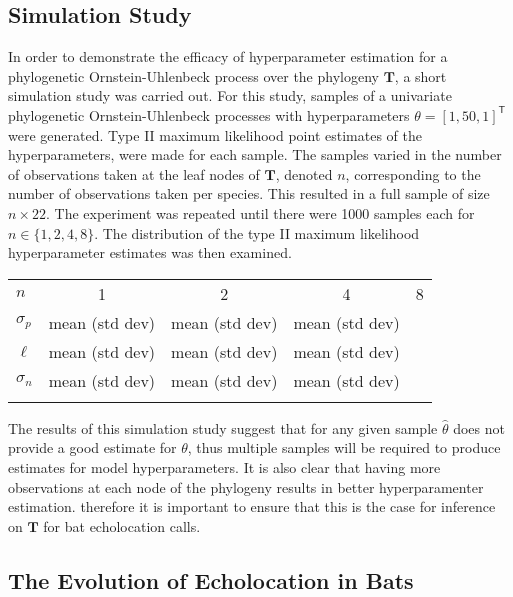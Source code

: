 \documentclass[wsdraft]{ws-rv9x6} %
\begin{document}
\subsection{Simulation Study}

In order to demonstrate the efficacy of hyperparameter estimation for a phylogenetic Ornstein-Uhlenbeck process over the phylogeny \(\mathbf{T}\), a short simulation study was carried out. For this study, samples of a univariate phylogenetic Ornstein-Uhlenbeck processes with hyperparameters \(\theta= [1,50,1]^{\mathsf{T}}\) were generated. Type II maximum likelihood point estimates of the hyperparameters, were made for each sample. The samples varied in the number of observations taken at the leaf nodes of \(\mathbf{T}\), denoted \(n\), corresponding to the number of observations taken per species. This resulted in a full sample of size \(n \times 22\). The experiment was repeated until there were 1000 samples each for \(n \in \{1,2,4,8\}\). The distribution of the type II maximum likelihood hyperparameter estimates was then examined.

\begin{table}[ht]
	{
		\begin{tabular}{@{}lcccc@{}} \toprule
			\(n\) & 1 & 2 & 4 & 8  \\ 
			\colrule
			\(\sigma_p \)  & mean (std dev) & mean (std dev) & mean (std dev)  \\
			\(\ell\)  & mean (std dev) & mean (std dev) & mean (std dev)  \\
			\(\sigma_n\)  & mean (std dev) & mean (std dev) & mean (std dev)  \\

			\botrule
		\end{tabular}
	}
	\label{tab::simulation}
\end{table}

The results of this simulation study suggest that for any given sample \(\hat{\theta}\) does not provide a good estimate for \(\theta\), thus multiple samples will be required to produce estimates for model hyperparameters. It is also clear that having more observations at each node of the phylogeny results in better hyperparamenter estimation. therefore it is important to ensure that this is the case for inference on \(\mathbf{T}\) for bat echolocation calls.  

\subsection{The Evolution of Echolocation in Bats}
\end{document}
